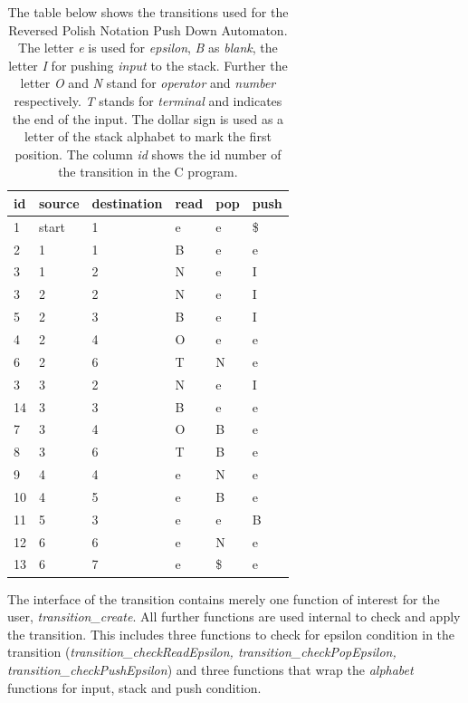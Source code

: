 \documentclass[a4paper,11pt,twoside]{article}
\begin{document}
\begin{table}[]
\centering
\caption{The table below shows the transitions used for the Reversed
  Polish Notation Push Down Automaton. The letter \textit{e} is used
  for \textit{epsilon}, \textit{B} as \textit{blank}, the letter
  \textit{I} for pushing \textit{input} to the stack. Further the
  letter \textit{O} and \textit{N} stand for \textit{operator} and
  \textit{number} respectively. \textit{T} stands for \textit{terminal} 
  and indicates the end of the input. The dollar sign is used as a
  letter of the stack alphabet to mark the first position. The column
  \textit{id} shows the id number of the transition in the C program.}
\label{tab:trans}
\begin{tabular}{llllll}
id & source & destination & read & pop & push \\ \hline
1  & start  & 1           & e    & e   & \$    \\
2  & 1      & 1           & B    & e   & e    \\
3  & 1      & 2           & N    & e   & I    \\
3  & 2      & 2           & N    & e   & I    \\
5  & 2      & 3           & B    & e   & I    \\
4  & 2      & 4           & O    & e   & e    \\
6  & 2      & 6           & T    & N   & e    \\
3  & 3      & 2           & N    & e   & I    \\
14 & 3      & 3           & B    & e   & e    \\
7  & 3      & 4           & O    & B   & e    \\
8  & 3      & 6           & T    & B   & e    \\
9  & 4      & 4           & e    & N   & e    \\
10 & 4      & 5           & e    & B   & e    \\
11 & 5      & 3           & e    & e   & B    \\
12 & 6      & 6           & e    & N   & e    \\
13 & 6      & 7           & e    & \$   & e   
\end{tabular}
\end{table}

The interface of the transition contains merely one function of
interest for the user, \textit{transition\_create}. All further
functions are used internal to check and apply the transition. This
includes three functions to check for epsilon condition in the
transition (\textit{transition\_checkReadEpsilon,
  transition\_checkPopEpsilon, transition\_checkPushEpsilon}) and three
functions that wrap the \textit{alphabet} functions for input, stack
and push condition. 
\end{document}
